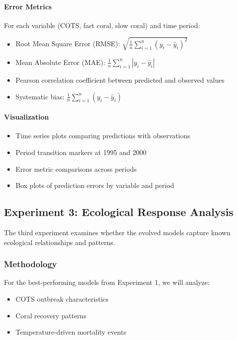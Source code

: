 \paragraph{Error Metrics}
For each variable (COTS, fast coral, slow coral) and time period:
\begin{itemize}
\item Root Mean Square Error (RMSE): $\sqrt{\frac{1}{n}\sum_{i=1}^n(y_i - \hat{y}_i)^2}$
\item Mean Absolute Error (MAE): $\frac{1}{n}\sum_{i=1}^n|y_i - \hat{y}_i|$
\item Pearson correlation coefficient between predicted and observed values
\item Systematic bias: $\frac{1}{n}\sum_{i=1}^n(y_i - \hat{y}_i)$
\end{itemize}

\paragraph{Visualization}
\begin{itemize}
\item Time series plots comparing predictions with observations
\item Period transition markers at 1995 and 2000
\item Error metric comparisons across periods
\item Box plots of prediction errors by variable and period
\end{itemize}

\subsection{Experiment 3: Ecological Response Analysis}

The third experiment examines whether the evolved models capture known ecological relationships and patterns.

\subsubsection{Methodology}

For the best-performing models from Experiment 1, we will analyze:
\begin{itemize}
\item COTS outbreak characteristics
\item Coral recovery patterns
\item Temperature-driven mortality events
\end{itemize}

